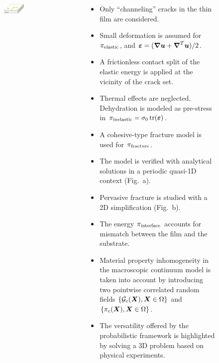 \begin{frame}{}
\begin{columns}
\begin{column}{0.3\textwidth}
\begin{figure}[htb!]
            \begin{subfigure}[b]{\textwidth}
                \centering
                \includegraphics[width=0.6\textwidth]{past/figures/3D_schematic.png}
                \caption{}
            \end{subfigure}
        \end{figure}
    \end{column}
    \begin{column}{0.7\textwidth}
        \begin{itemize}
            \item Only ``channeling'' cracks in the thin film are considered.
            \item Small deformation is assumed for $\pi_{\text{elastic}}$, and $\boldsymbol{\varepsilon} = (\boldsymbol{\nabla} \boldsymbol{u} + \boldsymbol{\nabla}^T \boldsymbol{u})/2$.
            \item \textcolor<5>{dukeroyal}{A frictionless contact split of the elastic energy is applied at the vicinity of the crack set.}
            \item Thermal effects are neglected. Dehydration is modeled as pre-stress in $\pi_{\text{inelastic}} = \sigma_0 \operatorname{tr}(\boldsymbol{\varepsilon})$.
            \item A cohesive-type fracture model is used for $\pi_{\text{fracture}}$.
            \pause
            \item The model is verified with analytical solutions in a periodic quasi-1D context (Fig.~a).
            \pause
            \item Pervasive fracture is studied with a 2D simplification (Fig.~b).
            \item The energy $\pi_{\text{interface}}$ accounts for mismatch between the film and the substrate.
            \item \textcolor<5>{dukeroyal}{Material property inhomogeneity in the macroscopic continuum model is taken into account by introducing two pointwise correlated random fields $\{{\mathcal{G}_c}(\boldsymbol{X}), \boldsymbol{X} \in \Omega\}$ and $\{\pi_c(\boldsymbol{X}), \boldsymbol{X} \in \Omega\}$.}
            \pause
            \item \textcolor<5>{dukeroyal}{The versatility offered by the probabilistic framework is highlighted by solving a 3D problem based on physical experiments.}
        \end{itemize}
    \end{column}
\end{columns}
\end{frame}

